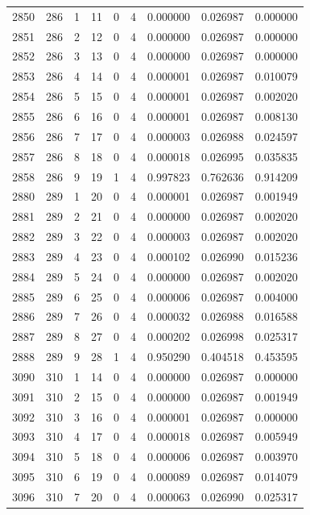 \begin{longtable}{rrrrrrrrr}
2850 & 286 & 1 & 11 & 0 & 4 & 0.000000 & 0.026987 & 0.000000 \\
2851 & 286 & 2 & 12 & 0 & 4 & 0.000000 & 0.026987 & 0.000000 \\
2852 & 286 & 3 & 13 & 0 & 4 & 0.000000 & 0.026987 & 0.000000 \\
2853 & 286 & 4 & 14 & 0 & 4 & 0.000001 & 0.026987 & 0.010079 \\
2854 & 286 & 5 & 15 & 0 & 4 & 0.000001 & 0.026987 & 0.002020 \\
2855 & 286 & 6 & 16 & 0 & 4 & 0.000001 & 0.026987 & 0.008130 \\
2856 & 286 & 7 & 17 & 0 & 4 & 0.000003 & 0.026988 & 0.024597 \\
2857 & 286 & 8 & 18 & 0 & 4 & 0.000018 & 0.026995 & 0.035835 \\
2858 & 286 & 9 & 19 & 1 & 4 & 0.997823 & 0.762636 & 0.914209 \\
2880 & 289 & 1 & 20 & 0 & 4 & 0.000001 & 0.026987 & 0.001949 \\
2881 & 289 & 2 & 21 & 0 & 4 & 0.000000 & 0.026987 & 0.002020 \\
2882 & 289 & 3 & 22 & 0 & 4 & 0.000003 & 0.026987 & 0.002020 \\
2883 & 289 & 4 & 23 & 0 & 4 & 0.000102 & 0.026990 & 0.015236 \\
2884 & 289 & 5 & 24 & 0 & 4 & 0.000000 & 0.026987 & 0.002020 \\
2885 & 289 & 6 & 25 & 0 & 4 & 0.000006 & 0.026987 & 0.004000 \\
2886 & 289 & 7 & 26 & 0 & 4 & 0.000032 & 0.026988 & 0.016588 \\
2887 & 289 & 8 & 27 & 0 & 4 & 0.000202 & 0.026998 & 0.025317 \\
2888 & 289 & 9 & 28 & 1 & 4 & 0.950290 & 0.404518 & 0.453595 \\
3090 & 310 & 1 & 14 & 0 & 4 & 0.000000 & 0.026987 & 0.000000 \\
3091 & 310 & 2 & 15 & 0 & 4 & 0.000000 & 0.026987 & 0.001949 \\
3092 & 310 & 3 & 16 & 0 & 4 & 0.000001 & 0.026987 & 0.000000 \\
3093 & 310 & 4 & 17 & 0 & 4 & 0.000018 & 0.026987 & 0.005949 \\
3094 & 310 & 5 & 18 & 0 & 4 & 0.000006 & 0.026987 & 0.003970 \\
3095 & 310 & 6 & 19 & 0 & 4 & 0.000089 & 0.026987 & 0.014079 \\
3096 & 310 & 7 & 20 & 0 & 4 & 0.000063 & 0.026990 & 0.025317 \\

\end{longtable}
